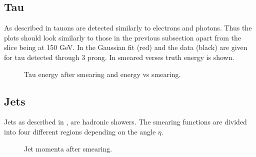 \subsection{Tau}
As described in  tauons are detected similarly to electrons and photons. Thus the plots should look similarly to those in the previous subsection apart from the slice being at 150 GeV. In  the Gaussian fit (red) and the data (black) are given for tau detected through 3 prong. In  smeared verses truth energy is shown. 
 \begin{figure}[H] %
    \hfill
    \caption{Tau energy after smearing and energy vs smearing.}
    \label{fig:tau}
  \end{figure}
  \newpage
\subsection{Jets}
Jets as described in , are hadronic showers. The smearing functions are divided into four different regions depending on the angle $\eta$. 
 \begin{figure}[H] %
    \hfill
{}
    \hfill
    \hfill
{}
        \hfill
{}
            \hfill
{}
    \caption{Jet momenta after smearing.}
    \label{fig:jet}
\end{figure}

